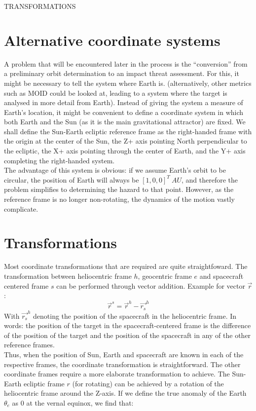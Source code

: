 \documentclass[a4paper,10pt]{article}
\begin{document}
TRANSFORMATIONS

\section{Alternative coordinate systems}
A problem that will be encountered later in the process is the ``conversion'' from a preliminary orbit determination to an impact threat assessment. For this, it might be necessary to tell the system where Earth is. (alternatively, other metrics such as MOID could be looked at, leading to a system where the target is analysed in more detail from Earth). Instead of giving the system a measure of Earth's location, it might be convenient to define a coordinate system in which both Earth and the Sun (as it is the main gravitational attractor) are fixed. We shall define the Sun-Earth ecliptic reference frame as the right-handed frame with the origin at the center of the Sun, the Z+ axis pointing North perpendicular to the ecliptic, the X+ axis pointing through the center of Earth, and the Y+ axis completing the right-handed system. \\

The advantage of this system is obvious: if we assume Earth's orbit to be circular, the position of Earth will always be $[1, 0, 0]^T~AU$, and therefore the problem simplifies to determining the hazard to that point. However, as the reference frame is no longer non-rotating, the dynamics of the motion vastly complicate.

\section{Transformations}

Most coordinate transformations that are required are quite straightfoward. The transformation between heliocentric frame $h$, geocentric frame $e$ and spacecraft centered frame $s$ can be performed through vector addition. Example for vector $\vec{r}$:
\begin{equation}
 \vec{r}^s = \vec{r}^h - \vec{r_s}^h
\end{equation}
With $\vec{r_s}^h$ denoting the position of the spacecraft in the heliocentric frame. In words: the position of the target in the spacecraft-centered frame is the difference of the position of the target and the position of the spacecraft in any of the other reference frames. \\

Thus, when the position of Sun, Earth and spacecraft are known in each of the respective frames, the coordinate transformation is straightforward. The other coordinate frames require a more elaborate transformation to achieve. The Sun-Earth ecliptic frame $r$ (for rotating) can be achieved by a rotation of the heliocentric frame around the Z-axis. If we define the true anomaly of the Earth $\theta_e$ as 0 at the vernal equinox, we find that:
\end{document}
